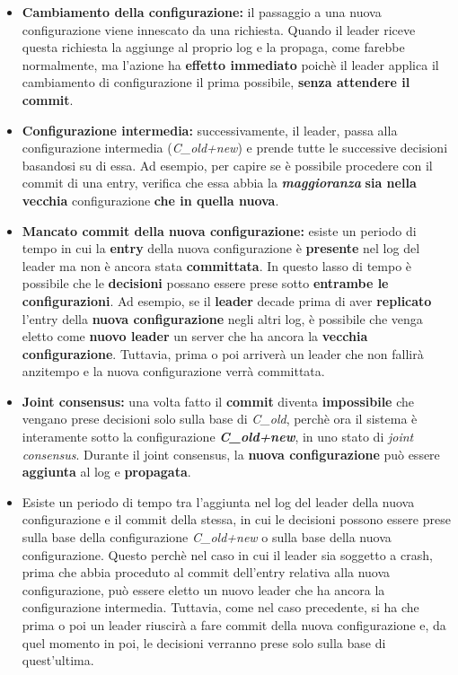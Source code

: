     \begin{itemize}
      \item{\textbf{Cambiamento della configurazione:} il passaggio a una nuova configurazione viene innescato da una richiesta. Quando il leader riceve questa richiesta la aggiunge al proprio log e la propaga, come farebbe normalmente, ma l'azione ha \textbf{effetto immediato} poichè il leader applica il cambiamento di configurazione il prima possibile, \textbf{senza attendere il commit}.}

      \item{\textbf{Configurazione intermedia:} successivamente, il leader, passa alla configurazione intermedia (\textit{C\_old+new}) e prende tutte le successive decisioni basandosi su di essa. Ad esempio, per capire se è possibile procedere con il commit di una entry, verifica che essa abbia la \textbf{\textit{maggioranza}} \textbf{sia nella vecchia} configurazione \textbf{che in quella nuova}.} 

      \item{\textbf{Mancato commit della nuova configurazione:} esiste un periodo di tempo in cui la \textbf{entry} della nuova configurazione è \textbf{presente} nel log del leader ma non è ancora stata \textbf{committata}. 
      In questo lasso di tempo è possibile che le \textbf{decisioni} possano essere prese sotto \textbf{entrambe le configurazioni}. Ad esempio, se il \textbf{leader} decade prima di aver \textbf{replicato} l'entry della \textbf{nuova configurazione} negli altri log, è possibile che venga eletto come \textbf{nuovo leader} un server che ha ancora la \textbf{vecchia configurazione}.
      Tuttavia, prima o poi arriverà un leader che non fallirà anzitempo e la nuova configurazione verrà committata. } 

      \item{\textbf{Joint consensus:} una volta fatto il \textbf{commit} diventa \textbf{impossibile} che vengano prese decisioni solo sulla base di \textit{C\_old}, perchè ora il sistema è interamente sotto la configurazione \textit{\textbf{C\_old+new}}, in uno stato di \textit{joint consensus}.
      Durante il joint consensus, la \textbf{nuova configurazione} può essere \textbf{aggiunta} al log e \textbf{propagata}.} 


      \item{Esiste un periodo di tempo tra l'aggiunta nel log del leader della nuova configurazione e il commit della stessa, in cui le decisioni possono essere prese sulla base della configurazione \textit{C\_old+new} o sulla base della nuova configurazione. 
      Questo perchè nel caso in cui il leader sia soggetto a crash, prima che abbia proceduto al commit dell'entry relativa alla nuova configurazione, può essere eletto un nuovo leader che ha ancora la configurazione intermedia. Tuttavia, come nel caso precedente, si ha che prima o poi un leader riuscirà a fare commit della nuova configurazione e, da quel momento in poi, le decisioni verranno prese solo sulla base di quest'ultima.} 

    \end{itemize}

